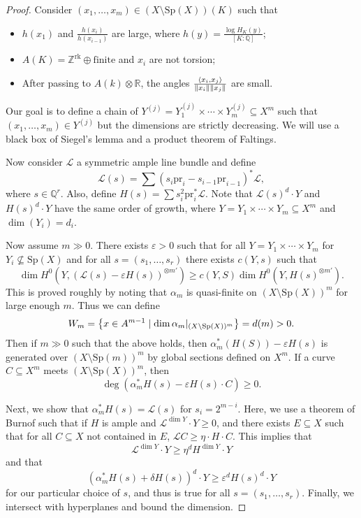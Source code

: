 \documentclass[leqno, openany]{memoir}
\theoremstyle{definition}
\theoremstyle{remark}
\theoremstyle{plain}
\theoremstyle{definition}
\theoremstyle{remark}
\newcommand{\R}{\mathbb{R}}
\newcommand{\Z}{\mathbb{Z}}
\newcommand{\Q}{\mathbb{Q}}
\newcommand{\ep}{\varepsilon}
\newcommand{\mc}[1]{\mathcal{#1}}
\newcommand{\mr}[1]{\mathrm{#1}}
\begin{document}
\begin{proof}
    Consider $(x_1, \ldots, x_m) \in (X \setminus \mr{Sp}(X))(K)$ such that 
    \begin{itemize}
        \item $h(x_1)$ and $\frac{h(x_i)}{h(x_{i-1})}$ are large, where $h(y) = \frac{\log H_K(y)}{[K:\Q]}$;
        \item $A(K) = \Z^{\mr{rk}} \oplus \text{finite}$ and $x_i$ are not torsion;
        \item After passing to $A(k) \otimes \R$, the angles $\frac{\ev{x_i, x_j}}{\norm{x_i} \norm{x_j}}$ are small.
    \end{itemize}
    Our goal is to define a chain of $Y^{(j)} = Y_1^{(j)} \times \cdots \times Y_m^{(j)} \subseteq X^m$ such that $(x_1, \ldots, x_m) \in Y^{(j)}$ but the dimensions are strictly decreasing. We will use a black box of Siegel's lemma and a product theorem of Faltings.

    Now consider $\mc{L}$ a symmetric ample line bundle and define
    \[ \mc{L}(s) = \sum (s_i \mr{pr}_i - s_{i-1} \mr{pr}_{i-1})^* \mc{L}, \]
    where $s \in \Q^r$. Also, define $H(s) = \sum s_i^2 \mr{pr}_i^* \mc{L}$. Note that $\mc{L}(s)^d \cdot Y$ and $H(s)^d \cdot Y$ have the same order of growth, where $Y = Y_1 \times \cdots \times Y_m \subseteq X^m$ and $\dim (Y_i) = d_i$.

    Now assume $m \gg 0$. There exists $\ep > 0$ such that for all $Y = Y_1 \times \cdots \times Y_m$ for $Y_i \not\subseteq \mr{Sp}(X)$ and for all $s = (s_1, \ldots, s_r)$ there exists $c(Y, s)$ such that
    \[ \dim H^0(Y, (\mc{L}(s) - \ep H(s))^{\otimes m'}) \geq c(Y, S) \dim H^0(Y, H(s)^{\otimes m'}). \]
    This is proved roughly by noting that $\alpha_m$ is quasi-finite on $(X \setminus \mr{Sp}(X))^m$ for large enough $m$. Thus we can define 
    \[ W_m = \qty{x \in A^{m-1} \mid \dim \alpha_m |_{(X \setminus \mr{Sp}(X))^m}} = d(m) > 0. \]
    Then if $m \gg 0$ such that the above holds, then $\alpha_m^* (H(S)) - \ep H(s)$ is generated over $(X \setminus \mr{Sp}(m))^m$ by global sections defined on $X^m$. If a curve $C \subseteq X^m$ meets $(X \setminus \mr{Sp}(X))^m$, then
     \[ \deg (\alpha_m^* H(s) - \ep H(s) \cdot C) \geq 0. \]

     Next, we show that $\alpha_m^* H(s) = \mc{L}(s)$ for $s_i = 2^{m-i}$. Here, we use a theorem of Burnof such that if $H$ is ample and $\mc{L}^{\dim Y} \cdot Y \geq 0$, and there exists $E \subseteq X$ such that for all $C \subseteq X$ not contained in $E$, $\mc{L} C \geq \eta \cdot H \cdot C$. This implies that
     \[ \mc{L}^{\dim Y} \cdot Y \geq \eta^d H^{\dim Y} \cdot Y \]
     and that
    \[ (\alpha_m^* H(s) + \delta H(s))^d \cdot Y \geq \ep^d H(s)^d \cdot Y \]
    for our particular choice of $s$, and thus is true for all $s = (s_1, \ldots, s_r)$. Finally, we intersect with hyperplanes and bound the dimension.
\end{proof}
\end{document}
